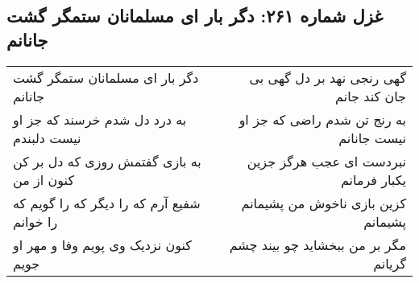 \begin{center}
\section*{غزل شماره ۲۶۱: دگر بار ای مسلمانان ستمگر گشت جانانم}
\label{sec:261}
\begin{longtable}{l p{0.5cm} r}
دگر بار ای مسلمانان ستمگر گشت جانانم
&&
گهی رنجی نهد بر دل گهی بی جان کند جانم
\\
به درد دل شدم خرسند که جز او نیست دلبندم
&&
به رنج تن شدم راضی که جز او نیست جانانم
\\
به بازی گفتمش روزی که دل بر کن کنون از من
&&
نبردست ای عجب هرگز جزین یکبار فرمانم
\\
شفیع آرم که را دیگر که را گویم که را خوانم
&&
کزین بازی ناخوش من پشیمانم پشیمانم
\\
کنون نزدیک وی پویم وفا و مهر او جویم
&&
مگر بر من ببخشاید چو بیند چشم گریانم
\\
\end{longtable}
\end{center}
